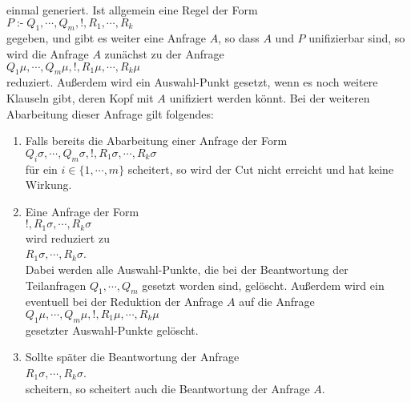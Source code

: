 einmal generiert.  Ist allgemein eine Regel der Form \\[0.1cm]
\hspace*{1.3cm} $P \;\texttt{:-}\; Q_1, \cdots, Q_m, \texttt{!}, R_1, \cdots, R_k$ \\[0.1cm]
gegeben, und gibt es weiter eine Anfrage $A$, so dass $A$ und $P$  unifizierbar sind, so
wird die Anfrage $A$ zunächst zu der Anfrage \\[0.1cm]
\hspace*{1.3cm} $Q_1\mu, \cdots, Q_m\mu, \texttt{!}, R_1\mu, \cdots, R_k\mu$ \\[0.1cm]
reduziert.  Außerdem wird ein Auswahl-Punkt gesetzt, wenn es noch weitere Klauseln gibt,
deren Kopf mit $A$ unifiziert werden könnt.
Bei der weiteren Abarbeitung dieser Anfrage gilt folgendes:
\begin{enumerate}
\item Falls bereits die Abarbeitung einer Anfrage der Form \\[0.1cm]
      \hspace*{1.3cm} 
      $Q_i\sigma, \cdots, Q_m\sigma, \texttt{!}, R_1\sigma, \cdots, R_k\sigma$ \\[0.1cm]
      für ein $i\in\{1,\cdots,m\}$ scheitert, so wird der Cut nicht erreicht und hat keine
      Wirkung.
\item Eine Anfrage der Form \\[0.1cm]
      \hspace*{1.3cm} 
      $\texttt{!}, R_1\sigma, \cdots, R_k\sigma$ \\[0.1cm]
      wird reduziert zu \\[0.1cm]
      \hspace*{1.3cm} 
      $R_1\sigma, \cdots, R_k\sigma$. \\[0.1cm]
      Dabei werden alle Auswahl-Punkte, die bei der Beantwortung der Teilanfragen
      $Q_1, \cdots, Q_m$ gesetzt worden sind, gelöscht.  Außerdem wird ein eventuell bei
      der Reduktion der Anfrage $A$ auf die Anfrage \\[0.1cm]
      \hspace*{1.3cm} $Q_1\mu, \cdots, Q_m\mu, \texttt{!}, R_1\mu, \cdots, R_k\mu$
      \\[0.1cm]
      gesetzter Auswahl-Punkte gelöscht.
\item Sollte später die Beantwortung der Anfrage \\[0.1cm]
      \hspace*{1.3cm} $R_1\sigma, \cdots, R_k\sigma$. \\[0.1cm]
      scheitern, so scheitert auch die Beantwortung der Anfrage $A$.
\end{enumerate}
